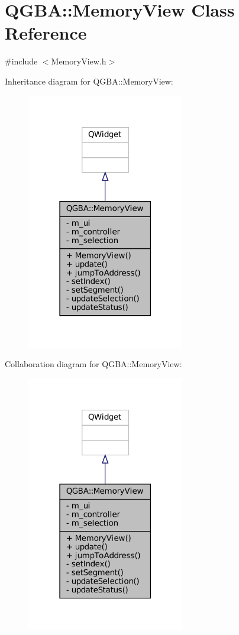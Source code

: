 \hypertarget{class_q_g_b_a_1_1_memory_view}{}\section{Q\+G\+BA\+:\+:Memory\+View Class Reference}
\label{class_q_g_b_a_1_1_memory_view}


{\ttfamily \#include $<$Memory\+View.\+h$>$}



Inheritance diagram for Q\+G\+BA\+:\+:Memory\+View\+:
\nopagebreak
\begin{figure}[H]
\begin{center}
\leavevmode
\includegraphics[width=195pt]{class_q_g_b_a_1_1_memory_view__inherit__graph}
\end{center}
\end{figure}


Collaboration diagram for Q\+G\+BA\+:\+:Memory\+View\+:
\nopagebreak
\begin{figure}[H]
\begin{center}
\leavevmode
\includegraphics[width=195pt]{class_q_g_b_a_1_1_memory_view__coll__graph}
\end{center}
\end{figure}
